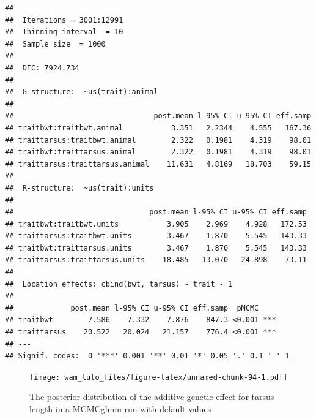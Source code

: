 \documentclass[
  12pt,
]{book}
\newenvironment{Shaded}{\begin{snugshade}}{\end{snugshade}}
\newcommand{\DecValTok}[1]{\textcolor[rgb]{0.00,0.00,0.81}{#1}}
\newcommand{\FloatTok}[1]{\textcolor[rgb]{0.00,0.00,0.81}{#1}}
\newcommand{\KeywordTok}[1]{\textcolor[rgb]{0.13,0.29,0.53}{\textbf{#1}}}
\newcommand{\NormalTok}[1]{#1}
\newcommand{\OperatorTok}[1]{\textcolor[rgb]{0.81,0.36,0.00}{\textbf{#1}}}
\newcommand{\StringTok}[1]{\textcolor[rgb]{0.31,0.60,0.02}{#1}}
\begin{document}
\begin{verbatim}
## 
##  Iterations = 3001:12991
##  Thinning interval  = 10
##  Sample size  = 1000 
## 
##  DIC: 7924.734 
## 
##  G-structure:  ~us(trait):animal
## 
##                                post.mean l-95% CI u-95% CI eff.samp
## traitbwt:traitbwt.animal           3.351   2.2344    4.555   167.36
## traittarsus:traitbwt.animal        2.322   0.1981    4.319    98.01
## traitbwt:traittarsus.animal        2.322   0.1981    4.319    98.01
## traittarsus:traittarsus.animal    11.631   4.8169   18.703    59.15
## 
##  R-structure:  ~us(trait):units
## 
##                               post.mean l-95% CI u-95% CI eff.samp
## traitbwt:traitbwt.units           3.905    2.969    4.928   172.53
## traittarsus:traitbwt.units        3.467    1.870    5.545   143.33
## traitbwt:traittarsus.units        3.467    1.870    5.545   143.33
## traittarsus:traittarsus.units    18.485   13.070   24.898    73.11
## 
##  Location effects: cbind(bwt, tarsus) ~ trait - 1 
## 
##             post.mean l-95% CI u-95% CI eff.samp  pMCMC    
## traitbwt        7.586    7.332    7.876    847.3 <0.001 ***
## traittarsus    20.522   20.024   21.157    776.4 <0.001 ***
## ---
## Signif. codes:  0 '***' 0.001 '**' 0.01 '*' 0.05 '.' 0.1 ' ' 1
\end{verbatim}

\begin{Shaded}
\end{Shaded}

\begin{figure}
\centering
\texttt{[image: wam\_tuto\_files/figure-latex/unnamed-chunk-94-1.pdf]}
\caption{\label{fig:unnamed-chunk-94}The posterior distribution of the additive genetic effect for tarsus length in a MCMCglmm run with default values}
\end{figure}

\begin{Shaded}
\end{Shaded}
\end{document}
